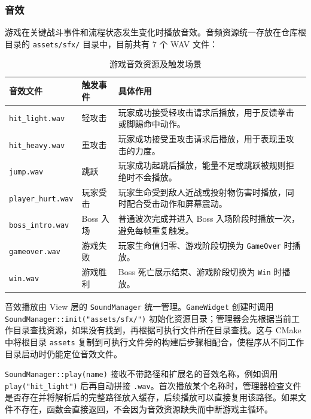 \documentclass[a4paper]{article}
\begin{document}
\subsubsection{音效}
游戏在关键战斗事件和流程状态发生变化时播放音效。音频资源统一存放在仓库根目录的 \texttt{assets/sfx/} 目录中，目前共有 7 个 WAV 文件：

\begin{table}[H]
  \centering
  \caption{游戏音效资源及触发场景}
  \begin{tabularx}{\textwidth}{|>{\centering\arraybackslash}m{}|>{\centering\arraybackslash}m{}|X|}
    \hline
    音效文件 & 触发事件 & 具体作用 \\
    \hline
    \texttt{hit\_light.wav} & 轻攻击 & 玩家成功接受轻攻击请求后播放，用于反馈拳击或脚踢命中动作。 \\
    \hline
    \texttt{hit\_heavy.wav} & 重攻击 & 玩家成功接受重攻击请求后播放，用于表现重攻击的力度。 \\
    \hline
    \texttt{jump.wav} & 跳跃 & 玩家成功起跳后播放，能量不足或跳跃被规则拒绝时不会播放。 \\
    \hline
    \texttt{player\_hurt.wav} & 玩家受击 & 玩家生命受到敌人近战或投射物伤害时播放，同时配合受击动作和屏幕震动。 \\
    \hline
    \texttt{boss\_intro.wav} & Boss 入场 & 普通波次完成并进入 Boss 入场阶段时播放一次，避免每帧重复触发。 \\
    \hline
    \texttt{gameover.wav} & 游戏失败 & 玩家生命值归零、游戏阶段切换为 \texttt{GameOver} 时播放。 \\
    \hline
    \texttt{win.wav} & 游戏胜利 & Boss 死亡展示结束、游戏阶段切换为 \texttt{Win} 时播放。 \\
    \hline
  \end{tabularx}
\end{table}

音效播放由 View 层的 \texttt{SoundManager} 统一管理。\texttt{GameWidget} 创建时调用 \texttt{SoundManager::init("assets/sfx/")} 初始化资源目录；管理器会先根据当前工作目录查找资源，如果没有找到，再根据可执行文件所在目录查找。这与 CMake 中将根目录 \texttt{assets} 复制到可执行文件旁的构建后步骤相配合，使程序从不同工作目录启动时仍能定位音效文件。

\texttt{SoundManager::play(name)} 接收不带路径和扩展名的音效名称，例如调用 \texttt{play("hit\_light")} 后再自动拼接 \texttt{.wav}。首次播放某个名称时，管理器检查文件是否存在并将解析后的完整路径放入缓存，后续播放可以直接复用该路径。如果文件不存在，函数会直接返回，不会因为音效资源缺失而中断游戏主循环。
\end{document}
